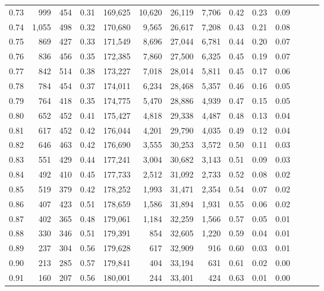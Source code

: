 \begin{tabular}{rrrrrrrrrrrrrr}
0.73 &    999 &  454 &  0.31 &  169,625 &   10,620 &  26,119 &   7,706 &  0.42 &  0.23 &      0.09 \\
0.74 &  1,055 &  498 &  0.32 &  170,680 &    9,565 &  26,617 &   7,208 &  0.43 &  0.21 &      0.08 \\
0.75 &    869 &  427 &  0.33 &  171,549 &    8,696 &  27,044 &   6,781 &  0.44 &  0.20 &      0.07 \\
0.76 &    836 &  456 &  0.35 &  172,385 &    7,860 &  27,500 &   6,325 &  0.45 &  0.19 &      0.07 \\
0.77 &    842 &  514 &  0.38 &  173,227 &    7,018 &  28,014 &   5,811 &  0.45 &  0.17 &      0.06 \\
0.78 &    784 &  454 &  0.37 &  174,011 &    6,234 &  28,468 &   5,357 &  0.46 &  0.16 &      0.05 \\
0.79 &    764 &  418 &  0.35 &  174,775 &    5,470 &  28,886 &   4,939 &  0.47 &  0.15 &      0.05 \\
0.80 &    652 &  452 &  0.41 &  175,427 &    4,818 &  29,338 &   4,487 &  0.48 &  0.13 &      0.04 \\
0.81 &    617 &  452 &  0.42 &  176,044 &    4,201 &  29,790 &   4,035 &  0.49 &  0.12 &      0.04 \\
0.82 &    646 &  463 &  0.42 &  176,690 &    3,555 &  30,253 &   3,572 &  0.50 &  0.11 &      0.03 \\
0.83 &    551 &  429 &  0.44 &  177,241 &    3,004 &  30,682 &   3,143 &  0.51 &  0.09 &      0.03 \\
0.84 &    492 &  410 &  0.45 &  177,733 &    2,512 &  31,092 &   2,733 &  0.52 &  0.08 &      0.02 \\
0.85 &    519 &  379 &  0.42 &  178,252 &    1,993 &  31,471 &   2,354 &  0.54 &  0.07 &      0.02 \\
0.86 &    407 &  423 &  0.51 &  178,659 &    1,586 &  31,894 &   1,931 &  0.55 &  0.06 &      0.02 \\
0.87 &    402 &  365 &  0.48 &  179,061 &    1,184 &  32,259 &   1,566 &  0.57 &  0.05 &      0.01 \\
0.88 &    330 &  346 &  0.51 &  179,391 &      854 &  32,605 &   1,220 &  0.59 &  0.04 &      0.01 \\
0.89 &    237 &  304 &  0.56 &  179,628 &      617 &  32,909 &     916 &  0.60 &  0.03 &      0.01 \\
0.90 &    213 &  285 &  0.57 &  179,841 &      404 &  33,194 &     631 &  0.61 &  0.02 &      0.00 \\
0.91 &    160 &  207 &  0.56 &  180,001 &      244 &  33,401 &     424 &  0.63 &  0.01 &      0.00 \\

\end{tabular}
